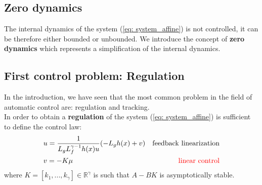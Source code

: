 \subsection{Zero dynamics}
The internal dynamics of the system (\ref{eq: system_affine}) is not controlled, it can be therefore either bounded or unbounded. We introduce the concept of \textbf{zero dynamics} which represents a simplification of the internal dynamics.\\

\hspace*{-5mm}
%

\vspace{0.2cm}
\hspace*{-5mm}
%

\subsection{First control problem: Regulation}
In the introduction, we have seen that the most common problem in the field of automatic control are: regulation and tracking.\\
In order to obtain a \textbf{regulation} of the system (\ref{eq: system_affine}) is sufficient to define the control law:
\begin{equation}\label{eq:regulation}
    \begin{aligned}
        &u=\frac{1}{L_gL_f^{\gamma-1}h(x)u}(-L_gh(x)+v) &\text{feedback linearization}\\
        &v=-K\mu &{\color{red}{\text{linear control}}}
    \end{aligned}
\end{equation}
where $K=[k_1,..., k_\gamma]\in\mathbb{R}^\gamma$ is such that $A-BK$ is asymptotically stable. \\


